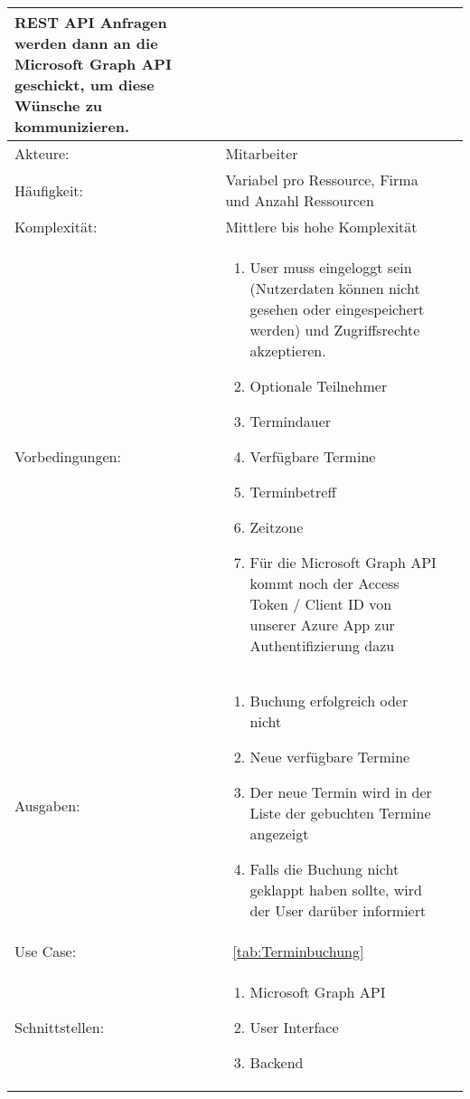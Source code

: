 \begin{tabularx}{\textwidth\footnotesize}{|l*{2}{|X}|}
    REST API Anfragen werden dann an die Microsoft Graph API geschickt, um diese Wünsche zu kommunizieren.\\
    \hline
    Akteure: & Mitarbeiter\\
    \hline
    Häufigkeit: & Variabel pro Ressource, Firma und Anzahl Ressourcen\\
    \hline
    Komplexität: & Mittlere bis hohe Komplexität\\
    \hline
    Vorbedingungen: & \begin{enumerate}
                          \item User muss eingeloggt sein (Nutzerdaten können nicht gesehen oder eingespeichert werden) und Zugriffsrechte akzeptieren.
                          \item Optionale Teilnehmer
                          \item Termindauer
                          \item Verfügbare Termine
                          \item Terminbetreff
                          \item Zeitzone
                          \item Für die Microsoft Graph API kommt noch der Access Token / Client ID von unserer Azure App zur Authentifizierung dazu
    \end{enumerate}\\
    \hline
    Ausgaben: & \begin{enumerate}
                    \item Buchung erfolgreich oder nicht
                    \item Neue verfügbare Termine
                    \item Der neue Termin wird in der Liste der gebuchten Termine angezeigt
                    \item Falls die Buchung nicht geklappt haben sollte, wird der User darüber informiert
    \end{enumerate}\\
    \hline
    Use Case: &~\ref{tab:Terminbuchung}\\
    \hline
Schnittstellen: & \begin{enumerate}
                        \item Microsoft Graph API
                        \item User Interface
                        \item Backend
                      \end{enumerate}\\

\end{tabularx}

